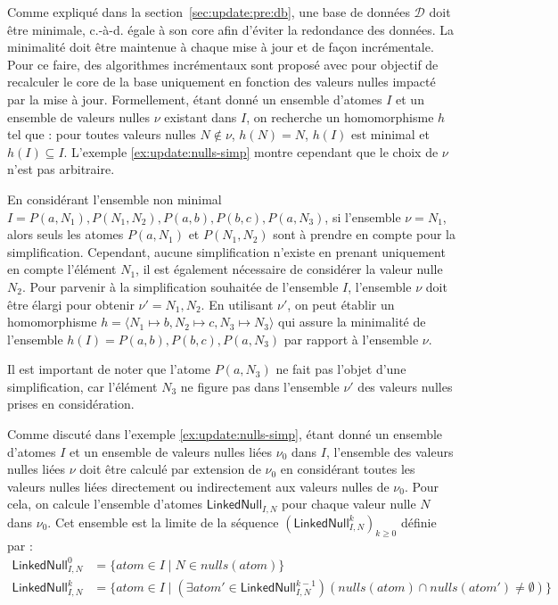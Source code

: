 Comme expliqué dans la section~\ref{sec:update:pre:db}, une base de données $\mathcal{D}$ doit être minimale, c.-à-d. égale à son \gls{core} afin d'éviter la redondance des données.
La minimalité doit être maintenue à chaque mise à jour et de façon incrémentale.
Pour ce faire, des algorithmes incrémentaux sont proposé avec pour objectif de recalculer le \gls{core}  de la base uniquement en fonction des valeurs nulles impacté par la mise à jour.
Formellement, étant donné un ensemble d'atomes $I$ et un ensemble de valeurs nulles $\nu$ existant dans $I$, on recherche un homomorphisme $h$ tel que : pour toutes valeurs nulles $N \notin \nu$, $h(N) = N$, $h(I)$ est minimal et $h(I) \subseteq I$.
L'exemple \ref{ex:update:nulls-simp} montre cependant que le choix de $\nu$ n'est pas arbitraire.

\begin{example}
	\label{ex:update:nulls-simp}
	En considérant l'ensemble non minimal $I = {P(a, N_1), P(N_1, N_2), P(a, b), P(b, c), P(a, N_3)}$, si l'ensemble $\nu = {N_1}$, alors seuls les atomes $P(a, N_1)$ et $P(N_1, N_2)$ sont à prendre en compte pour la simplification.
	Cependant, aucune simplification n'existe en prenant uniquement en compte l'élément $N_1$, il est également nécessaire de considérer la valeur nulle $N_2$.
	Pour parvenir à la simplification souhaitée de l'ensemble $I$, l'ensemble $\nu$ doit être élargi pour obtenir $\nu' = {N_1, N_2}$.
	En utilisant $\nu'$, on peut établir un homomorphisme $h = \langle N_1 \mapsto b, N_2 \mapsto c, N_3 \mapsto N_3 \rangle$ qui assure la minimalité de l'ensemble $h(I) = {P(a, b), P(b, c), P(a, N_3)}$ par rapport à l'ensemble $\nu$.

	Il est important de noter que l'atome $P(a, N_3)$ ne fait pas l'objet d'une simplification, car l'élément $N_3$ ne figure pas dans l'ensemble $\nu'$ des valeurs nulles prises en considération.
\end{example}

Comme discuté dans l'exemple \ref{ex:update:nulls-simp}, étant donné un ensemble d'atomes $I$ et un ensemble de valeurs nulles liées $\nu_0$ dans $I$, l'ensemble des valeurs nulles liées $\nu$ doit être calculé par extension de $\nu_0$ en considérant toutes les valeurs nulles liées directement ou indirectement aux valeurs nulles de $\nu_0$.
Pour cela, on calcule l'ensemble d'atomes $\textsf{LinkedNull}_{I,N}$ pour chaque valeur nulle $N$ dans $\nu_0$.
Cet ensemble est la limite de la séquence $(\textsf{LinkedNull}^k_{I,N})_{k \ge 0}$ définie par :
\begin{align}
	\textsf{LinkedNull}^0_{I,N} & = \{atom \in I \mid N \in nulls(atom)\}                                                                                 \\
	\textsf{LinkedNull}^k_{I,N} & = \{atom \in I \mid (\exists atom' \in \textsf{LinkedNull}^{k-1}_{I,N})(nulls(atom) \cap nulls(atom') \neq \emptyset)\}
\end{align}

